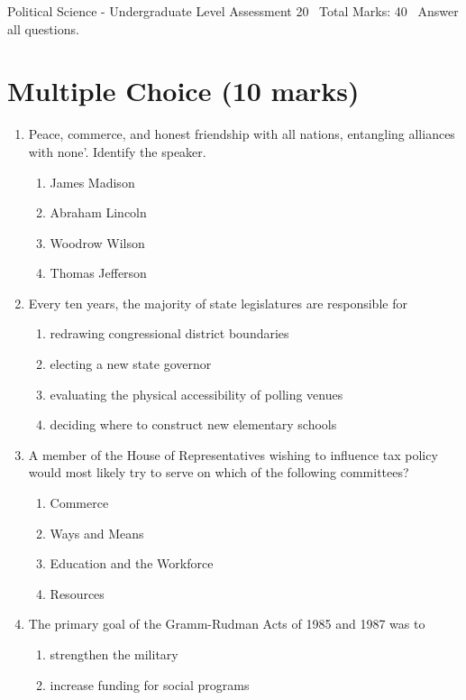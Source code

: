 \documentclass[12pt]{article}
\begin{document}
\begin{center}
Political Science - Undergraduate Level Assessment 20 \
Total Marks: 40 \
Answer all questions.
\end{center}

\section*{Multiple Choice (10 marks)}
\begin{enumerate}[label=\arabic*.]
\item Peace, commerce, and honest friendship with all nations, entangling alliances with none'. Identify the speaker.
\begin{enumerate}[label=(\alph*)]
    \item James Madison
    \item Abraham Lincoln
    \item Woodrow Wilson
    \item Thomas Jefferson
\end{enumerate}
\item Every ten years, the majority of state legislatures are responsible for
\begin{enumerate}[label=(\alph*)]
    \item redrawing congressional district boundaries
    \item electing a new state governor
    \item evaluating the physical accessibility of polling venues
    \item deciding where to construct new elementary schools
\end{enumerate}
\item A member of the House of Representatives wishing to influence tax policy would most likely try to serve on which of the following committees?
\begin{enumerate}[label=(\alph*)]
    \item Commerce
    \item Ways and Means
    \item Education and the Workforce
    \item Resources
\end{enumerate}
\item The primary goal of the Gramm-Rudman Acts of 1985 and 1987 was to
\begin{enumerate}[label=(\alph*)]
    \item strengthen the military
    \item increase funding for social programs

\end{enumerate}
\end{enumerate}
\end{document}
